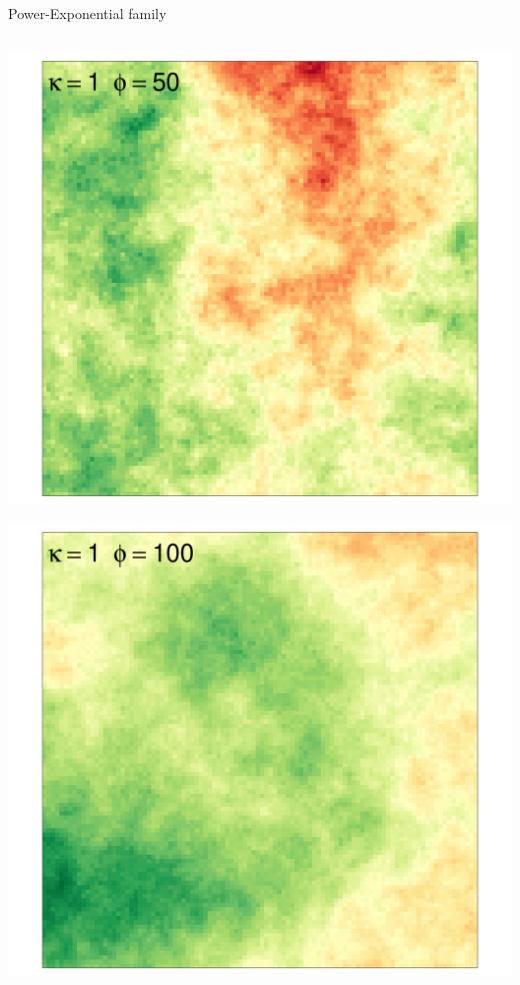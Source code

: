 \documentclass[
  ignorenonframetext,
]{beamer}
\begin{document}
\begin{frame}{Power-Exponential family}
\begin{columns}[T]
\begin{column}{0.33\textwidth}
\includegraphics{Lecture_1_files/figure-beamer/unnamed-chunk-15-1.pdf}

\includegraphics{Lecture_1_files/figure-beamer/unnamed-chunk-16-1.pdf}
\end{column}
\end{columns}
\end{frame}
\end{document}
